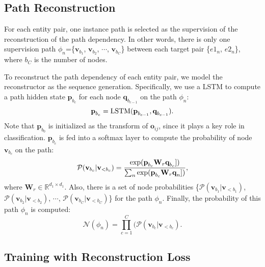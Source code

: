\documentclass[letterpaper]{article} \usepackage{aaai21}  \usepackage{times}  \usepackage{helvet} \usepackage{courier}  \usepackage[hyphens]{url}  \usepackage{graphicx} \urlstyle{rm} \def\UrlFont{\rm}  \usepackage{natbib}  \usepackage{caption} \frenchspacing  \setlength{\pdfpagewidth}{8.5in}  \setlength{\pdfpageheight}{11in}  \usepackage{amsmath}
\begin{document}
\subsection{Path Reconstruction}
For each entity pair, one instance path is selected as the supervision of the reconstruction of the path dependency.
In other words, there is only one supervision path $\phi_n$=\{$\textbf{v}_{b_1}$, $\textbf{v}_{b_2}$, $\cdots$, $\textbf{v}_{b_C}$\} between each target pair \{$e1_n$, $e2_n$\}, where $b_C$ is the number of nodes.

To reconstruct the path dependency of each entity pair, we model the reconstructor as the sequence generation.
Specifically, we use a LSTM to compute a path hidden state $\textbf{p}_{b_c}$ for each node $\textbf{q}_{b_{c-1}}$ on the path $\phi_n$:
\begin{equation}
\textbf{p}_{b_c}=\textup{LSTM}(\textbf{p}_{b_{c-1}}, \textbf{q}_{b_{c-1}}).
\label{eq9:lstminit}
\end{equation}
Note that $\textbf{p}_{b_0}$ is initialized as the transform of $\textbf{o}_{ij}$, since it plays a key role in classification.
$\textbf{p}_{b_c}$ is fed into a softmax layer to compute the probability of node $\textbf{v}_{b_c}$ on the path:
\begin{equation}
\begin{split}
\mathcal{P}(\textbf{v}_{b_c}|\textbf{v}_{<b_c})= \frac{\textup{exp}(\textbf{p}_{b_c} \textbf{W}_r \textbf{q}_{b_c}])}{\sum_{n}\textup{exp}(\textbf{p}_{b_c} \textbf{W}_r \textbf{q}_n])},
\end{split}
\label{eq7:nodeprobability}
\end{equation}
where $\textbf{W}_r \in \mathbb{R}^{d_1\times d_1}$. 
Also, there is a set of node probabilities  \{$\mathcal{P}(\textbf{v}_{b_1}|\textbf{v}_{<b_1})$, $\mathcal{P}(\textbf{v}_{b_2}|\textbf{v}_{<b_2})$, $\cdots$, $\mathcal{P}(\textbf{v}_{b_C}|\textbf{v}_{<b_C})$\} for the path $\phi_n$.
Finally, the probability of this path $\phi_n$ is computed:
\begin{equation}
\mathcal{N}(\phi_n)= \prod^{C}_{c=1}(\mathcal{P}(\textbf{v}_{b_c}|\textbf{v}_{<b_c}).
\label{eq8:pathprobability}
\end{equation}

\subsection{Training with Reconstruction Loss}
\end{document}
